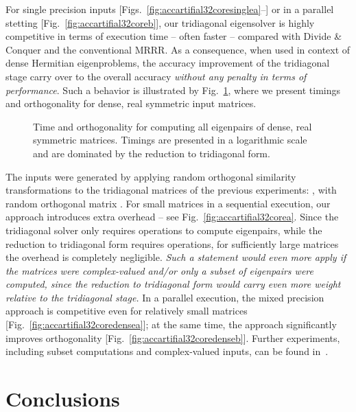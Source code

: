 \documentclass[final]{siamltex}
\begin{document}
For single precision inputs [Figs.~\ref{fig:accartifial32coresinglea}--]
or in a parallel stetting [Fig.~\ref{fig:accartifial32coreb}], our tridiagonal
eigensolver is highly competitive in terms of execution time --
often faster -- compared with Divide \& Conquer and the
conventional MRRR. As a consequence, when used in context of dense Hermitian
eigenproblems, the accuracy improvement of the tridiagonal stage carry over to the
overall accuracy {\it without any penalty in terms of performance}. Such a
behavior is illustrated by
Fig.~\ref{fig:accartifial32coredense}, where we present timings and orthogonality
for dense, real symmetric input matrices. 
\begin{figure}[tbh]
   \centering   
    
   \caption{
     Time and orthogonality for computing all eigenpairs of dense, real
     symmetric matrices. Timings are presented in a
     logarithmic scale and are dominated by the reduction to tridiagonal
     form.    
   }
   \label{fig:accartifial32coredense}
\end{figure}
The inputs were generated by applying random orthogonal similarity
transformations to the tridiagonal matrices of the previous experiments:
, with random orthogonal matrix . 
For small matrices in a sequential execution, our approach
introduces extra overhead -- see Fig.~\ref{fig:accartifial32corea}. Since 
the tridiagonal solver only requires  operations to compute 
eigenpairs, while the reduction to tridiagonal form requires
 operations, for sufficiently large matrices the overhead is
completely negligible. {\em Such a statement would even more apply if the matrices were
complex-valued and/or only a subset of eigenpairs were computed, since the
reduction to tridiagonal form would carry even more
weight relative to the tridiagonal stage.} 
In a parallel execution, the mixed precision approach is competitive even
for relatively small matrices [Fig.~\ref{fig:accartifial32coredensea}]; at
the same time, the approach significantly 
improves orthogonality [Fig.~\ref{fig:accartifial32coredenseb}]. Further
experiments, including  
subset computations and complex-valued inputs, can be found in~\cite{mydiss,mixedtr}.  


\section{Conclusions}
\end{document}
